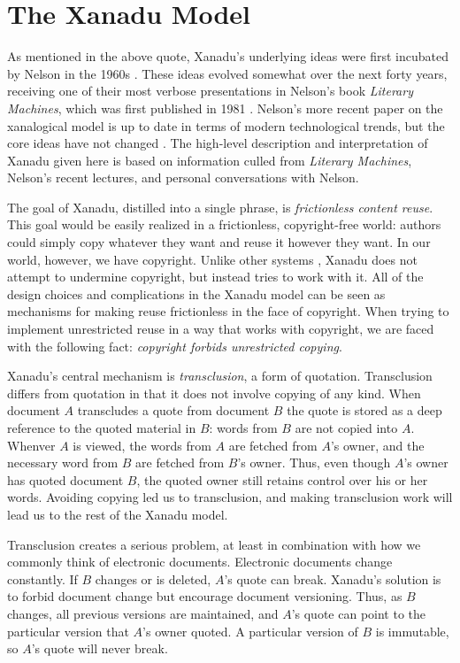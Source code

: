 \documentclass{acm_proc_article-sp}
\begin{document}
\section{The Xanadu Model}

As mentioned in the above quote, Xanadu's underlying ideas were first incubated by Nelson in the 1960s \cite{Nelson1965}.  
These ideas evolved somewhat over the next forty years, receiving one of their most verbose presentations in Nelson's book {\it Literary Machines}, which was first published in 1981 \cite{NelsonLiteraryMachines}.  
Nelson's more recent paper on the xanalogical model is up to date in terms of modern technological trends, but the core ideas have not changed \cite{Nelson1999}.  
The high-level description and interpretation of Xanadu given here is based on information culled from {\it Literary Machines}, Nelson's recent lectures, and personal conversations with Nelson.

The goal of Xanadu, distilled into a single phrase, is {\it frictionless content reuse}.  
This goal would be easily realized in a frictionless, copyright-free world:  authors could simply copy whatever they want and reuse it however they want.  
In our world, however, we have copyright.
Unlike other systems \cite{Clark2000}, Xanadu does not attempt to undermine copyright, but instead tries to work with it. 
All of the design choices and complications in the Xanadu model can be seen as mechanisms for making reuse frictionless in the face of copyright.
When trying to implement unrestricted reuse in a way that works with copyright, we are faced with the following fact:  {\it copyright forbids unrestricted copying}.

Xanadu's central mechanism is {\it transclusion}, a form of quotation.  
Transclusion differs from quotation in that it does not involve copying of any kind.  
When document $A$ transcludes a quote from document $B$ the quote is stored as a deep reference to the quoted material in $B$:  words from $B$ are not copied into $A$. 
Whenver $A$ is viewed, the words from $A$ are fetched from $A$'s owner, and the necessary word from $B$ are fetched from $B$'s owner.
Thus, even though $A$'s owner has quoted document $B$, the quoted owner still retains control over his or her words.
Avoiding copying led us to transclusion, and making transclusion work will lead us to the rest of the Xanadu model.

Transclusion creates a serious problem, at least in combination with how we commonly think of electronic documents.
Electronic documents change constantly.
If $B$ changes or is deleted, $A$'s quote can break.
Xanadu's solution is to forbid document change but encourage document versioning.
Thus, as $B$ changes, all previous versions are maintained, and $A$'s quote can point to the particular version that $A$'s owner quoted.
A particular version of $B$ is immutable, so $A$'s quote will never break.
\end{document}
